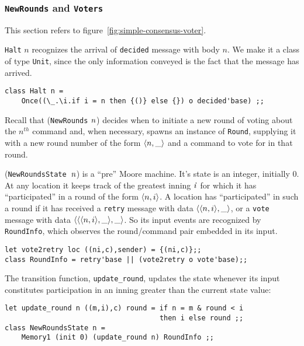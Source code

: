\documentclass[final]{article}
\begin{document}
\subsubsection{\lstinline{NewRounds} and \lstinline{Voters}}

This section refers to figure~\ref{fig:simple-consensus-voter}.


\lstinline{Halt} $n$ recognizes the arrival of \lstinline{decided}
message with body $n$.  We make it a class of type \lstinline{Unit},
since the only information conveyed is the fact that the message has
arrived.

\begin{emlcode}
\begin{lstlisting}
class Halt n = 
    Once((\_.\i.if i = n then {()} else {}) o decided'base) ;;
\end{lstlisting}
\end{emlcode}



Recall that (\lstinline{NewRounds} $\mathit{n}$) decides when to
initiate a new round of voting about the $n^{th}$ command and, when
necessary, spawns an instance of \lstinline{Round}, supplying it with
a new round number of the form $\langle n,\_\rangle$ and a command to
vote for in that round.

(\lstinline{NewRoundsState}~$\mathit{n}$) is a ``pre'' Moore machine.
It's state is an integer, initially $0$.  At any location it keeps
track of the greatest inning $\mathit{i}$ for which it has
``participated'' in a round of the form $\langle n,i\rangle$.  A
location has ``participated'' in such a round if it has received a
\lstinline{retry} message with data
$\langle\langle n,i\rangle,\_\rangle$, or a \lstinline{vote} message with
data $\langle\langle\langle n,i\rangle,\_\rangle,\_\rangle$.  So its input
events are recognized by \lstinline{RoundInfo}, which observes the
round/command pair embedded in its input.
\begin{emlcode}
\begin{lstlisting}
let vote2retry loc ((ni,c),sender) = {(ni,c)};;
class RoundInfo = retry'base || (vote2retry o vote'base);;
\end{lstlisting}
\end{emlcode}
The transition function, \lstinline{update_round}, updates
the state whenever its input constitutes participation in an inning
greater than the current state value:
\begin{emlcode}
\begin{lstlisting}
let update_round n ((m,i),c) round = if n = m & round < i
                                     then i else round ;;
class NewRoundsState n = 
    Memory1 (init 0) (update_round n) RoundInfo ;;
\end{lstlisting}
\end{emlcode}
\end{document}
